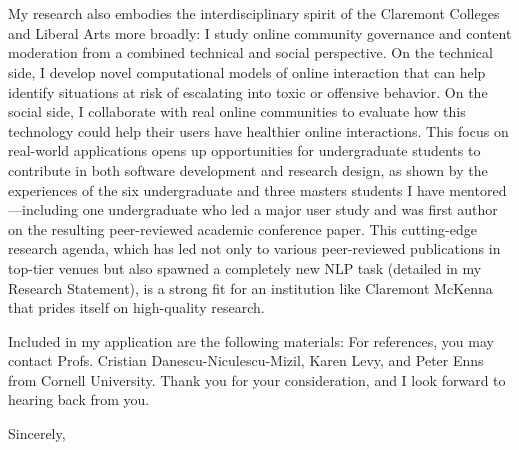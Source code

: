 \documentclass[12pt]{letter}
\begin{document}
\begin{letter}{
\department \\
\schoolnamelong \\
\schooladdress
}
My research also embodies the interdisciplinary spirit of the Claremont Colleges and Liberal Arts more broadly: I study online community governance and content moderation from a combined technical and social perspective.
On the technical side, I develop novel computational models of online interaction that can help identify situations at risk of escalating into toxic or offensive behavior.
On the social side, I collaborate with real online communities to evaluate how this technology could help their users have healthier online interactions.
This focus on real-world applications opens up opportunities for undergraduate students to contribute in both software development and research design, as shown by the experiences of the six undergraduate and three masters students I have mentored---including one undergraduate who led a major user study and was first author on the resulting peer-reviewed academic conference paper.
This cutting-edge research agenda, which has led not only to various peer-reviewed publications in top-tier venues but also spawned a completely new NLP task (detailed in my Research Statement), is a strong fit for an institution like Claremont McKenna that prides itself on high-quality research.

Included in my application are the following materials: \materials
For references, you may contact Profs. Cristian Danescu-Niculescu-Mizil, Karen Levy, and Peter Enns from Cornell University.
Thank you for your consideration, and I look forward to hearing back from you.

\closing{Sincerely,}

\end{letter}
\end{document}

